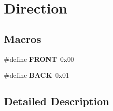 \hypertarget{group___direction}{\section{Direction}
\label{group___direction}
}
\subsection*{Macros}
\begin{DoxyCompactItemize}
\item 
\hypertarget{group___direction_gac25c6a324554f8ae267ad7c1638074a8}{\#define {\bfseries F\-R\-O\-N\-T}~0x00}\label{group___direction_gac25c6a324554f8ae267ad7c1638074a8}

\item 
\hypertarget{group___direction_gab303ee384877c80cb8855bf0113faf88}{\#define {\bfseries B\-A\-C\-K}~0x01}\label{group___direction_gab303ee384877c80cb8855bf0113faf88}

\end{DoxyCompactItemize}


\subsection{Detailed Description}
